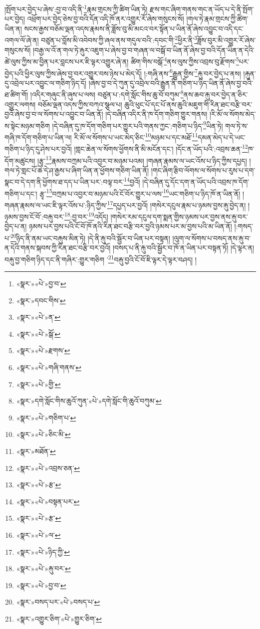 །སྤོག་པར་བྱེད་པ་ཞེས་:བྱ་བ་འདི་ནི་\footnote{«སྣར་»«པེ་»བྱ་བ་}རྣམ་གྲངས་ཀྱི་ཚིག་ཡིན་ཏེ། རྫས་གང་ཞིག་གནས་གང་ན་ཡོད་པ་དེ་ནི་སྤོག་པར་བྱེད། འཕྲོག་པར་བྱེད་ཅེས་བྱ་བའི་དོན་འདི་ཁོ་ནར་འགྱུར་རོ་ཞེས་གསུངས་སོ། །གལ་ཏེ་རྣམ་གྲངས་ཀྱི་ཚིག་ཡིན་ན། སངས་རྒྱས་བཅོམ་ལྡན་འདས་རྣམས་ནི་ཟློས་བུ་མི་མངའ་བར་སྟོན་པ་ཡིན་ནོ་ཞེས་འབྱུང་བ་འདི་དང་འགལ་ལོ་ཞེ་ན། བཙུན་པ་བློས་མི་འབེབས་ཀྱི་ཞལ་ནས་གདུལ་བའི་:དབང་གི་\footnote{«སྣར་»དབང་གིས་}ཕྱིར་ནི་\footnote{«སྣར་»«པེ་»ན་}ཟློས་བུར་མི་འགྱུར་རོ་ཞེས་གསུངས་སོ། །བརྒྱ་ལ་འོ་ན་གལ་ཏེ་རྐུར་འཇུག་པ་ཞེས་བྱ་བ་གཞན་ལ་བསྒོ་བ་ཡིན་ནོ་ཞེས་བྱ་བའི་དོན་ཡིན་ན་དེའི་ཚེ་ལུས་ཀྱིས་མ་བྱིན་པར་བླངས་པར་ཇི་ལྟར་འགྱུར་ཞེ་ན། ཚིག་གིས་བསྒོ་\footnote{«སྣར་»«པེ་»སྒོ་}ནས་ལུས་ཀྱིས་འབྲས་བུ་རྫོགས་\footnote{«སྣར་»«པེ་»རྫགས་}པར་བྱེད་པའི་ཕྱིར་ལུས་ཀྱིས་ཞེས་བྱ་བར་འགྱུར་བས་ཉེས་པ་མེད་དོ། །:གཞི་ནས་\footnote{«སྣར་»«པེ་»གཞི་གནས་}རྒྱུན་གྱིས་\footnote{«སྣར་»«པེ་»གྱི་}རྐུ་བར་བྱེད་པ་ནས། །རྐུན་དུ་འབྲེལ་པར་འབྱུང་ལ་གཅིག་ཉིད་དོ། །ཞེས་བྱ་བ་དེ་ཀུན་དུ་འབྲེལ་བའི་རྒྱུན་ནི་གཅིག་པ་ཉིད་ཡིན་ནོ་ཞེས་བྱ་བའི་ཐ་ཚིག་གོ། །འདིར་གཞུང་ནི་ཞུས་པ་ལས། བཙུན་པ་:དགེ་སློང་གིས་ཆུ་བོ་བཀུམ་\footnote{«སྣར་»དགེ་སློང་གིས་ཆུའོ་ཀུན་«པེ་»དགེ་སློང་གི་ཆུའོ་བཀུམ་}ནས་ཆབ་རྐུ་བར་བྱེད་ན་ཅིར་འགྱུར་ལགས། བཅོམ་ལྡན་འདས་ཀྱིས་བཀའ་སྩལ་པ། ཆུའི་ཕུང་པོ་དང་པོ་ནས་ཆུའི་མཇུག་གི་རིན་ཐང་བརྩི་བར་བྱའོ་ཞེས་བྱ་བ་ལ་སོགས་པ་འབྱུང་བ་ཡིན་ནོ། །དེ་བཞིན་འདིར་ནི་ཁ་དོག་གཅིག་གྱུར་གནས། །རི་མོ་ལ་སོགས་མེད་ས་སྟེང་མཉམ་གཅིག །དེ་བཞིན་དུ་ཁ་དོག་གཅིག་པར་གྱུར་པའི་གནས་ཀྱང་:གཅིག་པ་ཉིད་\footnote{«སྣར་»«པེ་»གཅིག་པ་}ཡིན་ཏེ། གལ་ཏེ་ས་གཞི་ཁ་དོག་གཅིག་པ་ཡིན་ལ། རི་མོ་ལ་སོགས་པ་ཡང་མེད་ཅིང་\footnote{«སྣར་»«པེ་»ཅིང་མི་}མཉམ་པ་དང་མཐོ་\footnote{«སྣར་»མཐོན་}དམན་མེད་པ་དེ་ཡང་གཅིག་པ་ཉིད་དུ་ཤེས་པར་བྱའོ། །གླང་ཆེན་ལ་སོགས་ཕྱོགས་ནི་མི་མངོན་དང་། །དོང་ན་ཡོད་པའི་:འབྲས་ཆན་\footnote{«སྣར་»«པེ་»འབྲས་ཅན་}ཁ་དོག་མཚུངས། །རྩྭ་\footnote{«སྣར་»«པེ་»རྩ་}རྣམས་བཀྲམ་པའི་འབྱར་བ་མཉམ་པའམ། །གཞན་རྣམས་ལ་ཡང་འོས་པ་ཉིད་ཀྱིས་དཔྱད། །གལ་ཏེ་གླང་པོ་ཆེ་དེ་ཤ་རྒྱས་པ་ཞིག་ཡིན་ན་ཕྱོགས་གཅིག་ཡིན་ནོ། །གང་ཞིག་རྩིབ་ལོགས་ལ་སོགས་པ་རུས་པ་དག་སྣང་བ་དེ་དག་ནི་ཕྱོགས་ཐ་དད་པ་ཡིན་པར་:བལྟ་བར་\footnote{«སྣར་»«པེ་»བསྟན་པར་}བྱའོ། །དེ་བཞིན་དུ་དོང་དག་ན་ཡོད་པའི་འབྲས་ཁ་དོག་གཅིག་པ་དང་། རྩྭ་\footnote{«སྣར་»«པེ་»རྩ་}བཀྲམ་པ་འབྱར་བ་མཉམ་པའི་ངོ་བོར་གྱུར་པ་ལས་\footnote{«སྣར་»«པེ་»ལ་}ཡང་གཅིག་པ་ཉིད་ཁོ་ན་ཡིན་ནོ། །གཞན་རྣམས་ལ་ཡང་ཇི་ལྟར་འོས་པ་:ཉིད་ཀྱིས་\footnote{«སྣར་»«པེ་»ཉིད་ཀྱི་}དཔྱད་པར་བྱའོ། །གསེར་དངུལ་རྣམ་པ་ཉམས་བྱས་རྐུ་བྱེད་ན། །ཉམས་བྱས་ངོ་བོ་:བརྐུ་བར་\footnote{«སྣར་»«པེ་»རྐུ་བར་}:བྱ་བར་\footnote{«སྣར་»«པེ་»བྱ་བ་}འདོད། །གསེར་རམ་དངུལ་དག་སྨན་གྱིས་ཉམས་པར་བྱས་ནས་རྐུ་བར་བྱེད་པ་ན། ཉམས་པར་བྱས་པའི་ངོ་བོ་ཁོ་ནའི་རིན་ཐང་བརྩི་བར་བྱའི་ཉམས་པར་མ་བྱས་པའི་མ་ཡིན་ནོ། །:གསད་པ་\footnote{«སྣར་»བསད་པར་«པེ་»བསད་པ་}ཉིད་ནི་ནམ་ཡང་བརྐུས་མིན་ཏེ། །དེ་ནི་རྐུ་བའི་སྦྱོར་བ་ཡིན་པར་བསྟན། །ལུག་ལ་སོགས་པ་བསད་ནས་རྐུ་བ་ན་དེའི་གནས་སྐབས་ཀྱི་རིན་ཐང་བརྩི་བར་བྱའོ། །བསད་པ་ནི་རྐུ་བའི་སྦྱོར་བ་ཁོ་ན་ཡིན་པར་བསྟན་ཏོ། །དེ་ལྟར་ན། བརྐུ་བྱ་གཅིག་ཉིད་དང་ནི་གཞིར་:གྱུར་གཅིག ་\footnote{«སྣར་»འགྱུར་ཅིག་«པེ་»གྱུར་ཅིག་}བརྐུ་བྱའི་ངོ་བོ་ཇི་ལྟར་དེ་ལྟར་བཤད། །

